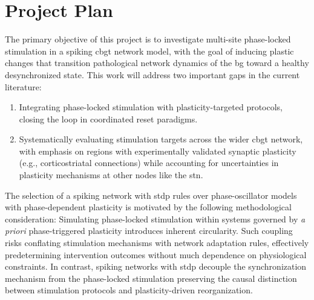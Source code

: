 \section{Project Plan}
The primary objective of this project is to investigate multi-site phase-locked stimulation in a spiking \acrshort{cbgt} network
model, with the goal of inducing plastic changes that transition pathological network dynamics of the \acrshort{bg} toward
a healthy desynchronized state. This work will address two important gaps in the current literature:
\begin{enumerate}[nosep]
	\item Integrating phase-locked stimulation with plasticity-targeted protocols, closing the loop in coordinated
	      reset paradigms.
	\item Systematically evaluating stimulation targets across the wider \acrshort{cbgt} network, with emphasis on regions with
	      experimentally validated synaptic plasticity (e.g., corticostriatal connections) while accounting for
	      uncertainties in plasticity mechanisms at other nodes like the \acrshort{stn}.
\end{enumerate}
The selection of a spiking network with \acrshort{stdp} rules over phase-oscillator models with phase-dependent plasticity is
motivated by the following methodological consideration:
Simulating phase-locked stimulation within systems governed by \textit{a priori} phase-triggered plasticity introduces
inherent circularity.
Such coupling risks conflating stimulation mechanisms with network adaptation rules, effectively predetermining
intervention outcomes without much dependence on physiological constraints.
In contrast, spiking networks with \acrshort{stdp} decouple the synchronization mechanism from the phase-locked stimulation
preserving the causal distinction between stimulation protocols and plasticity-driven reorganization.

